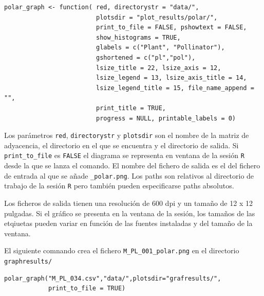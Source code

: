 \fontsize{3.5mm}{3.5mm}\selectfont
\begin{verbatim}
polar_graph <- function( red, directorystr = "data/", 
                         plotsdir = "plot_results/polar/", 
                         print_to_file = FALSE, pshowtext = FALSE,
                         show_histograms = TRUE, 
                         glabels = c("Plant", "Pollinator"),
                         gshortened = c("pl","pol"),
                         lsize_title = 22, lsize_axis = 12, 
                         lsize_legend = 13, lsize_axis_title = 14, 
                         lsize_legend_title = 15, file_name_append = "",
                         print_title = TRUE,
                         progress = NULL, printable_labels = 0)
\end{verbatim}
\normalsize

Los parámetros \texttt{red}, \texttt{directorystr} y \texttt{plotsdir} son el nombre de la matriz de adyacencia, el directorio en el que se encuentra y el directorio de salida. Si \texttt{print\_to\_file} es \texttt{FALSE} el diagrama se representa en ventana de la sesión \texttt{R} desde la que se lanza el comando. El nombre del fichero de salida es el del fichero de entrada al que se añade \texttt{\_polar.png}. Los paths son relativos al directorio de trabajo de la sesión \texttt{R} pero también pueden especificarse paths absolutos.

Los ficheros de salida tienen una resolución de 600 dpi y un tamaño de 12 x 12 pulgadas. Si el gráfico se presenta en la ventana de la sesión, los tamaños de las etqiuetas pueden variar en función de las fuentes instaladas y del tamaño de la ventana.

El siguiente comnando crea el fichero \texttt{M\_PL\_001\_polar.png} en el directorio \texttt{graphresults/}

\fontsize{3.5mm}{3.5mm}\selectfont
\begin{verbatim}
polar_graph("M_PL_034.csv","data/",plotsdir="grafresults/",
            print_to_file = TRUE)
\end{verbatim}
\normalsize

